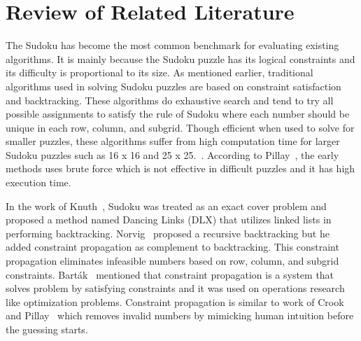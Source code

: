 \chapter{Review of Related Literature}\label{chap:RRL}

    The Sudoku has become the most common benchmark for evaluating existing algorithms. It is mainly because the Sudoku puzzle has its logical constraints and its difficulty is proportional to its size. As mentioned earlier, traditional algorithms used in solving Sudoku puzzles are based on constraint satisfaction and backtracking. These algorithms do exhaustive search and tend to try all possible assignments to satisfy the rule of Sudoku where each number should be unique in each row, column, and subgrid. Though efficient when used to solve for smaller puzzles, these algorithms suffer from high computation time for larger Sudoku puzzles such as 16 x 16 and 25 x 25.~\cite{manyam2024}. According to Pillay~\cite{pillay2012finding}, the early methods uses brute force which is not effective in difficult puzzles and it has high execution time. 

    In the work of Knuth~\cite{knuth}, Sudoku was treated as an exact cover problem and proposed a method named Dancing Links (DLX) that utilizes linked lists in performing backtracking. Norvig~\cite{norvig2006solving} proposed a recursive backtracking but he added constraint propagation as complement to backtracking. This constraint propagation eliminates infeasible numbers based on row, column, and subgrid constraints. Bart{\'a}k~\cite{bartak2005constraint} mentioned that constraint propagation is a system that solves problem by satisfying constraints and it was used on operations research like optimization problems. Constraint propagation is similar to work of Crook~\cite{crook2009pencil} and Pillay~\cite{pillay2012finding} which removes invalid numbers by mimicking human intuition before the guessing starts. 
    
